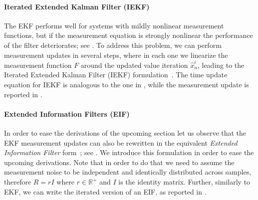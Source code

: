 

\paragraph{Iterated Extended Kalman Filter (IEKF)}
The EKF performs well for systems with mildly nonlinear measurement functions, but if the measurement equation is strongly nonlinear the performance of the filter deteriorates; see \cite{havlik2015performance}. To address this problem, we can perform measurement updates in several steps, where in each one we linearize the measurement function $F$ around the updated value iteration $\hat{x}_n^i$, leading to the Iterated Extended Kalman Filter (IEKF) formulation~\cite{havlik2015performance}. The time update equation for IEKF is analogous to the one in , while the measurement update is reported in .

\newpage


\paragraph{Extended Information Filters (EIF)}
\label{app:eif}
In order to ease the derivations of the upcoming section let us observe that the EKF measurement updates can also be rewritten in the equivalent \emph{Extended Information Filter} form~\cite{optimal}; see . We introduce this formulation in order to ease the upcoming derivations. Note that in order to do that we need to assume the measurement noise to be independent and identically distributed across samples, therefore $R=rI$ where $r\in \mathbb{R}^+$ and $I$ is the identity matrix. Further, similarly to EKF, we can write the iterated version of an EIF, as reported in .   


